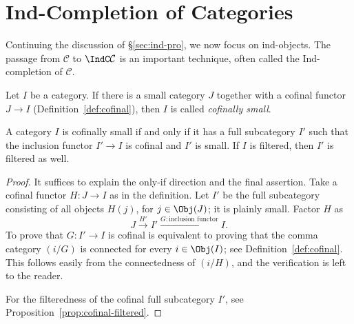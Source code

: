 
\section{Ind-Completion of Categories}\label{sec:Indization}
Continuing the discussion of \S\ref{sec:ind-pro}, we now focus on ind-objects. The passage from $\mathcal{C}$ to $\IndC\mathcal{C}$ is an important technique, often called the Ind-completion of $\mathcal{C}$.

\begin{definition}
	Let $I$ be a category. If there is a small category $J$ together with a cofinal functor $J\to I$ (Definition~\ref{def:cofinal}), then $I$ is called \emph{cofinally small}.
\end{definition}

\begin{lemma}\label{prop:cofinally-small-sub}
	A category $I$ is cofinally small if and only if it has a full subcategory $I'$ such that the inclusion functor $I'\to I$ is cofinal and $I'$ is small. If $I$ is filtered, then $I'$ is filtered as well.
\end{lemma}
\begin{proof}
	It suffices to explain the only-if direction and the final assertion. Take a cofinal functor $H:J\to I$ as in the definition. Let $I'$ be the full subcategory consisting of all objects $H(j)$, for $j\in\Obj(J)$; it is plainly small. Factor $H$ as
	\[ J \xrightarrow{H'} I' \xrightarrow{G: \text{inclusion functor}} I. \]
	To prove that $G:I'\to I$ is cofinal is equivalent to proving that the comma category $(i/G)$ is connected for every $i\in\Obj(I)$; see Definition~\ref{def:cofinal}. This follows easily from the connectedness of $(i/H)$, and the verification is left to the reader.

	For the filteredness of the cofinal full subcategory $I'$, see Proposition~\ref{prop:cofinal-filtered}.
\end{proof}

